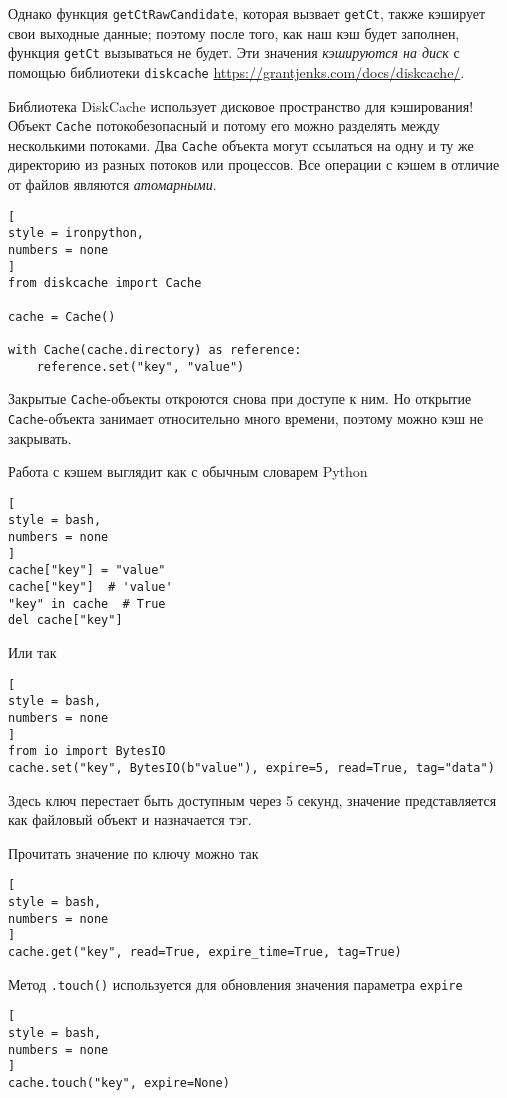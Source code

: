 \documentclass[%
	11pt,
	a4paper,
	utf8,
		]{article}
\begin{document}
Однако функция \verb|getCtRawCandidate|, которая вызвает \verb|getCt|, также кэширует свои выходные данные; поэтому после того, как наш кэш будет заполнен, функция \verb|getCt| вызываться не будет. Эти значения \emph{кэшируются на диск} с помощью библиотеки \verb|diskcache| \url{https://grantjenks.com/docs/diskcache/}.

Библиотека DiskCache использует дисковое пространство для кэширования! Объект \verb|Cache| потокобезопасный и потому его можно разделять между несколькими потоками. Два \verb|Cache| объекта могут ссылаться на одну и ту же директорию из разных потоков или процессов. Все операции с кэшем в отличие от файлов являются \emph{атомарными}.

\begin{lstlisting}[
style = ironpython,
numbers = none
]
from diskcache import Cache

cache = Cache()

with Cache(cache.directory) as reference:
    reference.set("key", "value")
\end{lstlisting}

Закрытые \verb|Cache|-объекты откроются снова при доступе к ним. Но открытие \verb|Cache|-объекта занимает относительно много времени, поэтому можно кэш не закрывать.

Работа с кэшем выглядит как с обычным словарем Python
\begin{lstlisting}[
style = bash,
numbers = none
]
cache["key"] = "value"
cache["key"]  # 'value'
"key" in cache  # True
del cache["key"]
\end{lstlisting}

Или так
\begin{lstlisting}[
style = bash,
numbers = none
]
from io import BytesIO
cache.set("key", BytesIO(b"value"), expire=5, read=True, tag="data")
\end{lstlisting}

Здесь ключ перестает быть доступным через 5 секунд, значение представляется как файловый объект и назначается тэг.

Прочитать значение по ключу можно так
\begin{lstlisting}[
style = bash,
numbers = none
]
cache.get("key", read=True, expire_time=True, tag=True)
\end{lstlisting}

Метод \verb|.touch()| используется для обновления значения параметра \verb|expire|
\begin{lstlisting}[
style = bash,
numbers = none
]
cache.touch("key", expire=None)
\end{lstlisting}
\end{document}

